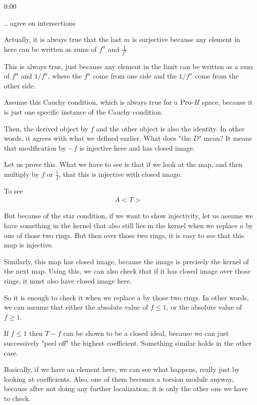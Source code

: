 \begin{unfinished}{0:00}
{\begin{theorem}
.. agree on intersections

Actually, it is always true that the last $m$ is surjective because any element in here can be written as sums of $f^n$ and $\frac{1}{f^n}$

%
This is always true, just because any element in the limit can be written as a sum of $f^n$ and $1/f^n$, where the $f^n$ come from one side and the $1/f^n$ come from the other side.

Assume this Cauchy condition, which is always true for a $\operatorname{Pro}$-$H$ space, because it is just one specific instance of the Cauchy condition.

%
Then, the derived object by $f$ and the other object is also the identity. In other words, it agrees with what we defined earlier. What does "the $D$" mean? It means that modification by $-f$ is injective here and has closed image.

Let us prove this. What we have to see is that if we look at the map, and then multiply by $f$ or $\frac{1}{f}$, that this is injective with closed image.

\begin{sketch}

To see
\begin{align*}
A<T> 
\end{align*}


\end{sketch}


%
But because of the star condition, if we want to show injectivity, let us assume we have something in the kernel that also still lies in the kernel when we replace $a$ by one of those two rings. But then over those two rings, it is easy to see that this map is injective.

%
Similarly, this map has closed image, because the image is precisely the kernel of the next map. Using this, we can also check that if it has closed image over those rings, it must also have closed image here.

%
So it is enough to check it when we replace $a$ by those two rings. In other words, we can assume that either the absolute value of $f \leq 1$, or the absolute value of $f \geq 1$.

%
If $f \leq 1$ then $T - f$ can be shown to be a closed ideal, because we can just successively "peel off" the highest coefficient. Something similar holds in the other case.

%
Basically, if we have an element here, we can see what happens, really just by looking at coefficients. Also, one of them becomes a torsion module anyway, because after not doing any further localization, it is only the other one we have to check.


\end{theorem}}
\end{unfinished}
